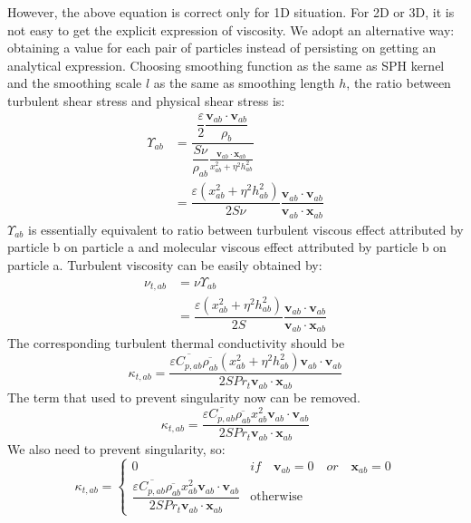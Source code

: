 \documentclass[journal abbreviation, manuscript]{copernicus}
\begin{document}
However, the above equation is correct only for 1D situation. For 2D or 3D, it is not easy to get the explicit expression of viscosity. 
We adopt an alternative way: obtaining a value for each pair of particles instead of persisting on getting an analytical expression. Choosing smoothing function as the same as SPH kernel and the smoothing scale $l$ as the same as smoothing length $h$, the ratio between turbulent shear stress and physical shear stress is: 
\begin{equation}
\begin{split}
\Upsilon_{ab} &= \dfrac{\dfrac{\varepsilon}{2} \dfrac{\textbf{v}_{ab} \cdot \textbf{v}_{ab}}{\rho_b}}{\dfrac{S \nu}{\rho_{ab}} \frac{\textbf{v}_{ab} \cdot \textbf{x}_{ab}}{x_{ab}^2 + \eta^2 h_{ab}^2}} \\
 & = \dfrac{\varepsilon (x_{ab}^2 + \eta^2 h_{ab}^2)}{2 S \nu} \dfrac{\textbf{v}_{ab} \cdot \textbf{v}_{ab}}{\textbf{v}_{ab} \cdot \textbf{x}_{ab}}
\end{split}
\end{equation}
$\Upsilon_{ab}$ is essentially equivalent to ratio between turbulent viscous effect attributed by particle b on particle a and molecular viscous effect attributed by particle b on particle a. Turbulent viscosity can be easily obtained by:
\begin{equation}
\begin{split}
\nu_{t,ab} &= \nu \Upsilon_{ab} \\
&= \dfrac{\varepsilon (x_{ab}^2 + \eta^2 h_{ab}^2)}{2 S} \dfrac{\textbf{v}_{ab} \cdot \textbf{v}_{ab}}{\textbf{v}_{ab} \cdot \textbf{x}_{ab}}
\end{split}
\end{equation}
The corresponding turbulent thermal conductivity should be
\begin{equation}
\kappa_{t,ab}=\dfrac{\varepsilon \overline{C_{p,ab}} \overline{\rho_{ab}} (x_{ab}^2 + \eta^2 h_{ab}^2) \textbf{v}_{ab} \cdot \textbf{v}_{ab}}{2 S Pr_t\textbf{v}_{ab} \cdot \textbf{x}_{ab}}
\end{equation}
The term that used to prevent singularity now can be removed. 
\begin{equation}
\kappa_{t,ab}=\dfrac{\varepsilon \overline{C_{p,ab}} \overline{\rho_{ab}} x_{ab}^2 \textbf{v}_{ab} \cdot \textbf{v}_{ab}}{2 S Pr_t\textbf{v}_{ab} \cdot \textbf{x}_{ab} }
\end{equation}
We also need to prevent singularity, so: 
\begin{equation}
\kappa_{t,ab}= 
\begin{cases} 
      0 & if  \quad \textbf{v}_{ab}=0 \quad or \quad \textbf{x}_{ab}=0 \\
      \dfrac{\varepsilon \overline{C_{p,ab}} \overline{\rho_{ab}} x_{ab}^2 \textbf{v}_{ab} \cdot \textbf{v}_{ab}}{2 S Pr_t\textbf{v}_{ab} \cdot \textbf{x}_{ab} } & \text{otherwise}
\end{cases}
\label{eq:SPH-LANS-heat-conductivity}
\end{equation}
\end{document}
